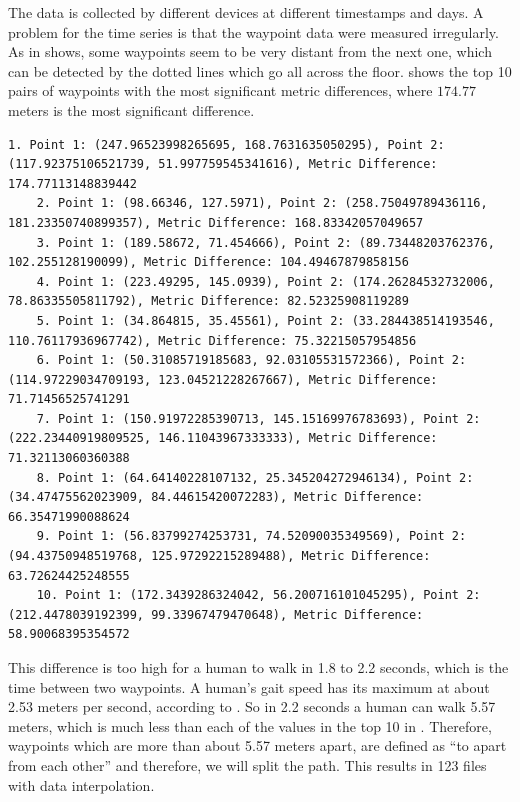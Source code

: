 The data is collected by different devices at different timestamps and days.
A problem for the time series is that the waypoint data were measured irregularly.
As in  shows, some waypoints seem to be very distant from the next one, which can be detected by the dotted lines which go all across the floor.
 shows the top 10 pairs of waypoints with the most significant metric differences, where \(174.77\) meters is the most significant difference.\\

\begin{lstlisting}[caption={Top 10 pairs with the most significant metric differences of data from floor F1 of site Yintai City (Chengxi Branch)},label={lst:metric-diff}]
    1. Point 1: (247.96523998265695, 168.7631635050295), Point 2: (117.92375106521739, 51.997759545341616), Metric Difference: 174.77113148839442
    2. Point 1: (98.66346, 127.5971), Point 2: (258.75049789436116, 181.23350740899357), Metric Difference: 168.83342057049657
    3. Point 1: (189.58672, 71.454666), Point 2: (89.73448203762376, 102.255128190099), Metric Difference: 104.49467879858156
    4. Point 1: (223.49295, 145.0939), Point 2: (174.26284532732006, 78.86335505811792), Metric Difference: 82.52325908119289
    5. Point 1: (34.864815, 35.45561), Point 2: (33.284438514193546, 110.76117936967742), Metric Difference: 75.32215057954856
    6. Point 1: (50.31085719185683, 92.03105531572366), Point 2: (114.97229034709193, 123.04521228267667), Metric Difference: 71.71456525741291
    7. Point 1: (150.91972285390713, 145.15169976783693), Point 2: (222.23440919809525, 146.11043967333333), Metric Difference: 71.32113060360388
    8. Point 1: (64.64140228107132, 25.345204272946134), Point 2: (34.47475562023909, 84.44615420072283), Metric Difference: 66.35471990088624
    9. Point 1: (56.83799274253731, 74.52090035349569), Point 2: (94.43750948519768, 125.97292215289488), Metric Difference: 63.72624425248555
    10. Point 1: (172.3439286324042, 56.200716101045295), Point 2: (212.4478039192399, 99.33967479470648), Metric Difference: 58.90068395354572
\end{lstlisting}

This difference is too high for a human to walk in 1.8 to 2.2 seconds, which is the time between two waypoints.
A human's gait speed has its maximum at about 2.53 meters per second, according to \cite{bohannonComfortableMaximumWalking1997}.
So in 2.2 seconds a human can walk 5.57 meters, which is much less than each of the values in the top 10 in .
Therefore, waypoints which are more than about 5.57 meters apart, are defined as ``to apart from each other'' and therefore, we will split the path.
This results in 123 files with data interpolation.


